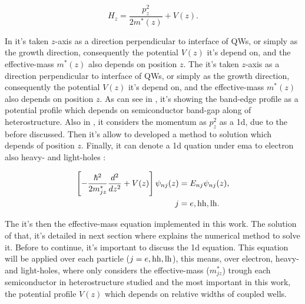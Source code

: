 \begin{equation}\label{eqn:chapter-2-sec-numerical-calculations-ema-hamiltonian}
	H_{z} = \dfrac{p_{z}^{2}}{2m^{*}(z)}+V(z).
\end{equation}


In  it's taken $z$-axis as a direction perpendicular to interface of QWs, or simply as the growth direction, consequently the potential $V(z)$ it's depend on, and the effective-mass $m^{*}(z)$ also depends on position $z$. The  it's taken $z$-axis as a direction perpendicular to interface of QWs, or simply as the growth direction, consequently the potential $V(z)$ it's depend on, and the effective-mass $m^{*}(z)$ also depends on position $z$. As can see in , it's showing the band-edge profile as a potential profile which depends on semiconductor band-gap along of heterostructure.  Also in , it considers the momentum as $p_{z}^{2}$ as a \gls{1d}, due to the before discussed. Then it's allow to developed a method to solution which depends of position $z$. Finally, it can denote a \gls{1d} \sch quation under \gls{ema} to electron also heavy- and light-holes : 

\begin{equation}\label{eqn:chapter-2-sec-numerical-calculations-ema-schrodinger}
	\begin{split}
	\left[-\dfrac{\hbar^2}{2m_{jz}^{*}}\dfrac{d^2}{dz^2}+V(z) \right]\psi_{nj}(z)&= E_{nj}\psi_{nj}(z),\\
	                                                               j&=e,\mathrm{hh},\mathrm{lh}.
	\end{split}
\end{equation}

The  it's then the effective-mass equation implemented in this work. The solution of that, it's detailed in next section where explains the numerical method to solve it. Before to continue, it's important to discuss the \gls{1d} equation. This equation will be applied over each particle ($j=e,\mathrm{hh},\mathrm{lh}$), this means, over electron, heavy- and light-holes, where only considers the effective-mass ($m_{jz}^{*}$) trough each semiconductor in heterostructure studied and the most important in this work, the potential profile $V(z)$ which depends on relative widths of coupled wells. 


